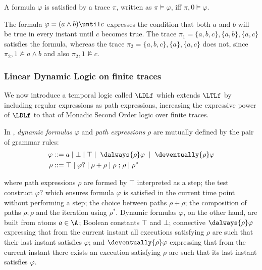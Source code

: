 \begin{definition}
    A formula $\varphi$ is satisfied by a trace $\pi$, written as $\pi\models\varphi$, iff $\pi,0\models\varphi$.
\end{definition}

\begin{example}
    The formula $\varphi=(a\wedge b)\until c$ expresses the condition that both $a$ and $b$ will be true in every instant until $c$ becomes true. The trace $\pi_1=\{a,b,c\},\{a,b\},\{a,c\}$ satisfies the formula, whereas the trace $\pi_2=\{a,b,c\},\{a\},\{a,c\}$ does not, since $\pi_2,1 \not\models a\wedge b$ and also $\pi_2,1 \not\models c$.
\end{example}

\subsubsection{Linear Dynamic Logic on finite traces \LDLf}

We now introduce a temporal logic called $\LDLf$ \cite{giavar13a} which extends $\LTLf$ by including regular expressions as path expressions, increasing the expressive power of $\LDLf$ to that of Monadic Second Order logic over finite traces. 

In \LDLf, \emph{dynamic formulas} $\varphi$ and \emph{path expressions} $\rho$ are mutually defined by the pair of grammar rules:
\begin{align*}
  \varphi &::= a \mid \bot \mid \top \mid \; \dalways{\rho} \varphi \; \mid \; \deventually{\rho} \varphi \\
  \rho    &::=  \top \mid \varphi ? \mid \rho + \rho \mid \rho\mathrel{;}\rho \mid \rho^{\ast}
\end{align*}

where path expressions $\rho$ are formed by $\top$ interpreted as a step; the test construct $\varphi?$ which ensures formula $\varphi$ is satisfied in the current time point without performing a step; the choice between paths $\rho+\rho$; the composition of paths $\rho;\rho$ and the iteration using $\rho^\ast$. Dynamic formulas $\varphi$, on the other hand, are built from atoms $a\in\A$; Boolean constants $\top$ and $\bot$; connective $\dalways{\rho}\varphi$ expressing that from the current instant all executions satisfying $\rho$ are such that their last instant satisfies $\varphi$; and $\deventually{\rho}\varphi$ expressing that from the current instant there exists an execution satisfying $\rho$ are such that its last instant satisfies $\varphi$.

